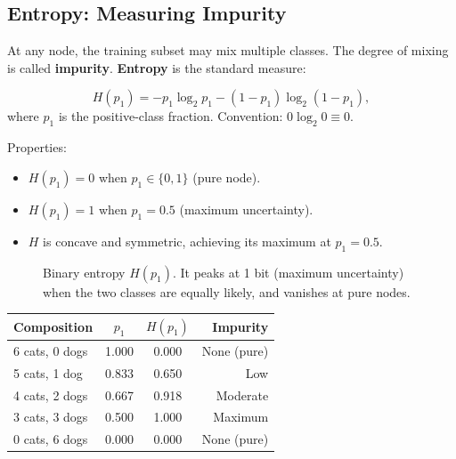 \subsection{Entropy: Measuring Impurity}
\label{sec:entropy}

At any node, the training subset may mix multiple classes. The degree of mixing
is called \textbf{impurity}. \textbf{Entropy} is the standard measure:

\begin{equation}
H(p_1)=-p_1\log_2 p_1-(1-p_1)\log_2(1-p_1),
\label{eq:entropy}
\end{equation}
where $p_1$ is the positive-class fraction. Convention: $0\log_2 0\equiv 0$.

Properties:
\begin{itemize}
\item $H(p_1)=0$ when $p_1\in\{0,1\}$ (pure node).
\item $H(p_1)=1$ when $p_1=0.5$ (maximum uncertainty).
\item $H$ is concave and symmetric, achieving its maximum at $p_1=0.5$.
\end{itemize}

\begin{figure}[h]
\centering
{}
\caption{Binary entropy $H(p_1)$. It peaks at 1 bit (maximum uncertainty) when
the two classes are equally likely, and vanishes at pure nodes.}
\label{fig:entropy-curve}
\end{figure}

\begin{center}
\begin{tabular}{lccr}
\toprule
\textbf{Composition} & $p_1$ & $H(p_1)$ & \textbf{Impurity}\\
\midrule
6 cats, 0 dogs & 1.000 & 0.000 & None (pure)\\
5 cats, 1 dog  & 0.833 & 0.650 & Low\\
4 cats, 2 dogs & 0.667 & 0.918 & Moderate\\
3 cats, 3 dogs & 0.500 & 1.000 & Maximum\\
0 cats, 6 dogs & 0.000 & 0.000 & None (pure)\\
\bottomrule
\end{tabular}
\end{center}

